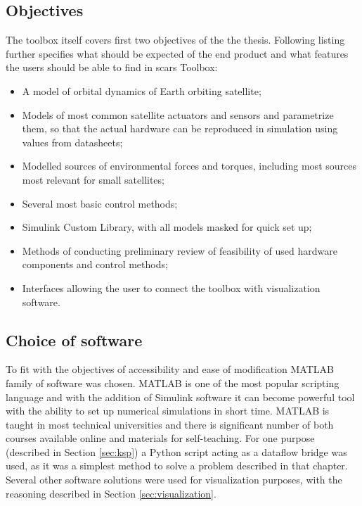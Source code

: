 \subsection{Objectives}\label{toolbox:objectives}
    The toolbox itself covers first two objectives of the the thesis. Following listing further specifies what should be expected of the end product and what features the users should be able to find in \ac{scars} Toolbox: 
    \begin{itemize}
        \item A model of orbital dynamics of Earth orbiting satellite;
        \item Models of most common satellite actuators and sensors and parametrize them, so that the actual hardware can be reproduced in simulation using values from datasheets;
        \item Modelled sources of environmental forces and torques, including most sources most relevant for small satellites;
        \item Several most basic control methods;
        \item Simulink Custom Library, with all models masked for quick set up;
        \item Methods of conducting preliminary review of feasibility of used hardware components and control methods;
        \item Interfaces allowing the user to connect the toolbox with visualization software.
    \end{itemize}

\subsection{Choice of software}\label{toolbox:software}
    To fit with the objectives of accessibility and ease of modification MATLAB family of software was chosen. MATLAB is one of the most popular scripting language and with the addition of Simulink software it can become powerful tool with the ability to set up numerical simulations in short time. MATLAB is taught in most technical universities and there is significant number of both courses available online and materials for self-teaching. For one purpose (described in Section \ref{sec:ksp}) a Python script acting as a dataflow bridge was used, as it was a simplest method to solve a problem described in that chapter. Several other software solutions were used for visualization purposes, with the reasoning described in Section \ref{sec:visualization}.

